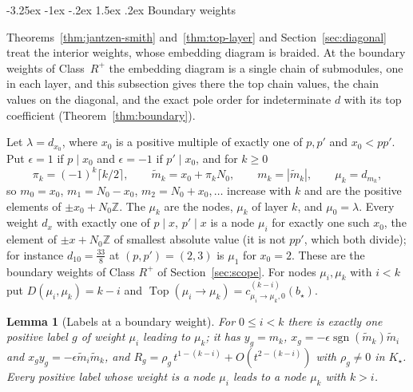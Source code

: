 \documentclass[twoside,10pt]{article}
\makeatletter
\numberwithin{equation}{section}
\theoremstyle{slbody}
\newtheorem{lemma}[theorem]{Lemma}
\theoremstyle{definition}
\theoremstyle{remark}
\renewcommand{\subsection}{%
  \@startsection{subsection}{2}{\z@}%
    {-3.25ex \@plus -1ex \@minus -.2ex}%
    {1.5ex \@plus .2ex}%
    {\normalfont\normalsize\bfseries}}
\makeatother
\begin{document}
\subsection{Boundary weights}\label{sec:boundary}

Theorems~\ref{thm:jantzen-smith} and~\ref{thm:top-layer} and
Section~\ref{sec:diagonal} treat the interior weights, whose embedding diagram
is braided.  At the boundary weights of Class~\(R^+\) the embedding diagram is
a single chain of submodules, one in each layer, and this subsection gives
there the top chain values, the chain values on the diagonal, and the exact
pole order for indeterminate \(d\) with its top coefficient
(Theorem~\ref{thm:boundary}).

Let $\lambda=d_{x_0}$, where $x_0$ is a positive multiple of exactly one of
$p,p'$ and $x_0<pp'$.  Put $\epsilon=1$ if $p\mid x_0$ and $\epsilon=-1$ if
$p'\mid x_0$, and for $k\geq0$
\[
 \pi_k=(-1)^k\lceil k/2\rceil,\qquad \tilde m_k=x_0+\pi_kN_0,\qquad m_k=|\tilde m_k|,\qquad
 \mu_k=d_{m_k},
\]
so $m_0=x_0$, $m_1=N_0-x_0$, $m_2=N_0+x_0,\dots$ increase with $k$ and are the
positive elements of $\pm x_0+N_0\mathbb Z$.  The $\mu_k$ are the nodes, $\mu_k$ of
layer $k$, and $\mu_0=\lambda$.  Every weight $d_x$ with exactly one of
$p\mid x$, $p'\mid x$ is a node $\mu_i$ for exactly one such $x_0$, the element
of $\pm x+N_0\mathbb Z$ of smallest absolute value (it is not $pp'$, which both
divide); for instance $d_{10}=\frac{33}8$ at $(p,p')=(2,3)$ is $\mu_1$ for
$x_0=2$.  These are the boundary weights of Class $R^+$ of
Section~\ref{sec:scope}.  For nodes $\mu_i,\mu_k$ with $i<k$ put
$D(\mu_i,\mu_k)=k-i$ and $\operatorname{Top}(\mu_i\to\mu_k)=
c^{(k-i)}_{\mu_i\to\mu_k,0}(b_\star)$.

\begin{lemma}[Labels at a boundary weight]\label{lem:boundary-labels}
For $0\leq i<k$ there is exactly one positive label $g$ of weight $\mu_i$
leading to $\mu_k$; it has $y_g=m_k$, $x_g=-\epsilon\operatorname{sgn}(\tilde m_k)\tilde m_i$ and
$x_gy_g=-\epsilon\tilde m_i\tilde m_k$, and $R_g=\rho_g\,t^{1-(k-i)}+O(t^{2-(k-i)})$ with
$\rho_g\neq0$ in $K_\star$.  Every positive label whose weight is a node $\mu_i$
leads to a node $\mu_k$ with $k>i$.
\end{lemma}
\end{document}

